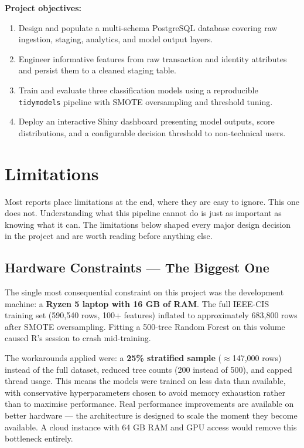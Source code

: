\documentclass[12pt, a4paper]{article}
\begin{document}
\medskip
\noindent\textbf{Project objectives:}
\begin{enumerate}
    \item Design and populate a multi-schema PostgreSQL database covering raw
    ingestion, staging, analytics, and model output layers.
    \item Engineer informative features from raw transaction and identity attributes
    and persist them to a cleaned staging table.
    \item Train and evaluate three classification models using a reproducible
    \texttt{tidymodels} pipeline with SMOTE oversampling and threshold tuning.
    \item Deploy an interactive Shiny dashboard presenting model outputs, score
    distributions, and a configurable decision threshold to non-technical users.
\end{enumerate}

\section{Limitations}

Most reports place limitations at the end, where they are easy to ignore. This one
does not. Understanding what this pipeline cannot do is just as important as knowing
what it can. The limitations below shaped every major design decision in the project
and are worth reading before anything else.

\subsection{Hardware Constraints --- The Biggest One}

The single most consequential constraint on this project was the development machine:
a \textbf{Ryzen 5 laptop with 16 GB of RAM}. The full IEEE-CIS training set
(590,540 rows, 100+ features) inflated to approximately 683,800 rows after SMOTE
oversampling. Fitting a 500-tree Random Forest on this volume caused R's session
to crash mid-training.

The workarounds applied were: a \textbf{25\% stratified sample} ($\approx$147,000
rows) instead of the full dataset, reduced tree counts (200 instead of 500), and
capped thread usage. This means the models were trained on less data than available,
with conservative hyperparameters chosen to avoid memory exhaustion rather than to
maximise performance. Real performance improvements are available on better hardware
--- the architecture is designed to scale the moment they become available. A cloud
instance with 64 GB RAM and GPU access would remove this bottleneck entirely.
\end{document}
